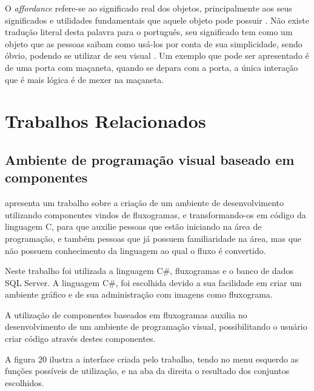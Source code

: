 \documentclass[12pt,oneside,a4paper,chapter=TITLE,section=TITLE,sumario=tradicional]{abntex2}
\begin{document}
O \textit{affordance} refere-se ao significado real dos objetos, principalmente aos seus significados e utilidades fundamentais que aquele objeto pode possuir \cite{norman2002}. Não existe tradução literal desta palavra para o português, seu significado tem como um objeto que as pessoas saibam como usá-los por conta de sua simplicidade, sendo óbvio, podendo se utilizar de seu visual \cite{agni2015}. Um exemplo que pode ser apresentado é de uma porta com maçaneta, quando se depara com a porta, a única interação que é mais lógica é de mexer na maçaneta.

\chapter{Trabalhos Relacionados}
\label{cap:trabalhos-relacionados}

\section{Ambiente de programação visual baseado em componentes}
\label{sec:ambiente-de-programacao-visual-baseado-em-componentes}
 
\cite{juliana2015} apresenta um trabalho sobre a criação de um ambiente de desenvolvimento utilizando componentes vindos de fluxogramas, e transformando-os em código da linguagem C, para que auxilie pessoas que estão iniciando na área de programação, e também pessoas que já possuem familiaridade na área, mas que não possuem conhecimento da linguagem ao qual o fluxo é convertido.

Neste trabalho foi utilizada a linguagem C\#, fluxogramas e o banco de dados SQL Server. A linguagem C\#, foi escolhida devido a sua facilidade em criar um ambiente gráfico e de sua administração com imagens como fluxograma.

A utilização de componentes baseados em fluxogramas auxilia no desenvolvimento de um ambiente de programação visual, possibilitando o usuário criar código através destes componentes.

A figura 20 ilustra a interface criada pelo trabalho, tendo no menu esquerdo as funções possíveis de utilização, e na aba da direita o resultado dos conjuntos escolhidos. 

\begin{figure}[htb]
\end{figure}
\end{document}

